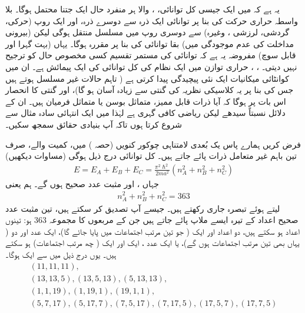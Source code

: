  یہ ہے کہ   میں ایک جیسی کل توانائی، ،  والا  ہر منفرد حال ایک جتنا محتمل ہوگا۔ بلا واسطہ حراری حرکت کی بنا پر  توانائی ایک ذرہ  سے دوسرے ذرہ، اور  ایک روپ  (حرکی، گردشی، لرزشی ، وغیرہ) سے دوسری روپ میں  مسلسل  منتقل ہوگی لیکن  (بیرونی مداخلت کی عدم موجودگی میں)  بقا  توانائی کی بنا پر   مقررہ ہوگا۔ یہاں   (بہت گہرا اور قابل سوچ) مفروضہ یہ ہے  کہ توانائی کی مستمر    تقسیم کسی مخصوص حال کو ترجیح نہیں دیتی۔ ،  ،  حراری توازن میں ایک نظام کی کل توانائی کی  ایک   پیمائش ہے۔ ان   میں کوانٹائی  میکانیات ایک نئی  پیچیدگی  پیدا کرتی ہے ( تاہم  حالات غیر مسلسل ہوتے ہیں جس  کی بنا پر   یہ  کلاسیکی نظریہ کی گنتی  سے زیادہ آسان  ہو گا)،   اور  گنتی کا   انحصار اس بات پر ہوگا کہ  آیا  ذرات قابل ممیز، متماثل بوسن یا متماثل فرمیان ہیں۔ ان کے دلائل نسبتاً سیدھے لیکن ریاضی کافی گہری ہے لہٰذا میں ایک انتہائی سادہ  مثال سے شروع کرتا   ہوں  تاکہ آپ بنیادی حقائق سمجھ سکیں۔

 
فرض کریں ہمارے پاس یک بُعدی لامتناہی چوکور کنویں  (حصہ )  میں، کمیت  والے، صرف تین باہم غیر متعامل ذرات پائے جاتے ہیں۔  کل توانائی درج ذیل ہوگی (مساوات   دیکھیں)
\begin{align}
	E = E_A + E_B + E_C = \frac{\pi^2 \hslash ^2}{2ma^2}(n^2_A + n^2_B + n^2_C)
\end{align}
جہاں ،  اور  مثبت عدد صحیح ہوں گے۔ ہم  یعنی
\begin{align}
	n^2_A + n^2_B + n^2_C = 363
\end{align}  
لیتے ہوئے تبصرہ جاری رکھتے ہیں۔ جیسے آپ تصدیق کر سکتے ہیں، تین مثبت عدد صحیح اعداد کے تیرہ  ایسے ملاپ  پائے جاتے ہیں جن کے مربعوں کا مجموعہ \num{363} ہو: تینوں اعداد    ہو سکتے ہیں،  دو اعداد     اور ایک   (  جو تین مرتب اجتماعات میں پایا جائے گا)،  ایک عدد  اور دو   ( یہاں بھی تین مرتب اجتماعات  ہوں گے)،  یا ایک عدد ،  ایک  اور ایک   ( چھ مرتب اجتماعات) ہو سکتے ہیں۔ یوں   درج ذیل میں سے ایک ہوگا۔
\begin{gather*}
	(11, 11, 11),\\
	(13, 13, 5), (13, 5, 13), (5, 13, 13),\\
	(1, 1, 19), (1, 19, 1), (19, 1, 1),\\
	(5, 7, 17), (5, 17, 7), (7, 5, 17), (7, 17, 5), (17, 5, 7), (17, 7, 5)
\end{gather*}

